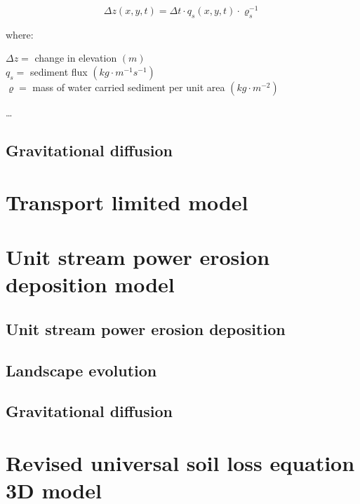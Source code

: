 \documentclass[final,3p,times,twocolumn]{elsarticle}
\begin{document}

\begin{equation}
\label{eq:evolution} 
{\Delta z(x,y,t) = \Delta t \cdot q_s(x,y,t) \cdot \varrho_s^{-1} }
\end{equation}

\noindent
where: 

\noindent
$\Delta z =$ change in elevation $(m)$ \\
$q_s =$ sediment flux $(kg \cdot m^{-1} s^{-1})$ \\
$\varrho =$ mass of water carried sediment per unit area $(kg \cdot m^{-2})$ \\
\vspace{1em}

\ldots
\cite{mitasova2013}


\subsection{Gravitational diffusion}

\section{Transport limited model} \label{transport_model}


\section{Unit stream power erosion deposition model} \label{usped_model}

\subsection{Unit stream power erosion deposition} %
\subsection{Landscape evolution}
\subsection{Gravitational diffusion}

\clearpage
\section{Revised universal soil loss equation 3D model}
\label{rusle_model} %
\end{document}
